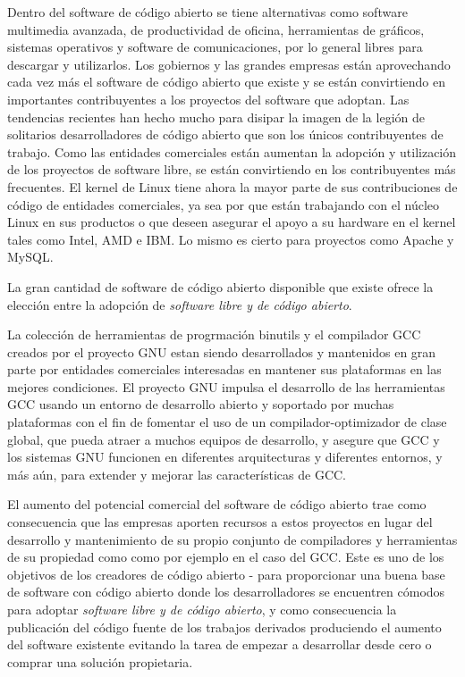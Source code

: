 	Dentro del software de código abierto se tiene alternativas como software multimedia avanzada, de productividad de oficina,  herramientas de
gráficos, sistemas operativos y software de comunicaciones, por lo general libres para descargar y utilizarlos. Los gobiernos y las grandes empresas están aprovechando cada vez más el software de código abierto que existe y se están convirtiendo en importantes contribuyentes a los proyectos del software que adoptan. Las tendencias recientes han hecho mucho para disipar la imagen de la legión de solitarios desarrolladores de código abierto que son los únicos contribuyentes de trabajo.
Como las entidades comerciales están aumentan la adopción y utilización de los proyectos de software libre,  se están convirtiendo en los contribuyentes más frecuentes. El kernel de Linux tiene ahora la mayor parte de sus contribuciones de código de entidades comerciales, ya sea por que están trabajando con el núcleo Linux en sus productos o que deseen asegurar el apoyo a su hardware en el kernel tales como Intel, AMD e IBM. Lo mismo es cierto para proyectos como Apache y MySQL.


La gran cantidad de software de código abierto disponible que existe ofrece la elección entre la adopción de \textit{software libre y de código abierto}. 

La colección de herramientas de progrmación binutils y el compilador GCC creados por el proyecto GNU estan siendo desarrollados y mantenidos en gran parte por entidades comerciales interesadas en mantener sus plataformas en las mejores condiciones. El proyecto GNU impulsa el desarrollo de las herramientas GCC usando un entorno de desarrollo abierto y soportado por muchas plataformas con el fin de fomentar el uso de un compilador-optimizador de clase global, que pueda atraer a muchos equipos de desarrollo, y asegure que GCC y los sistemas GNU funcionen en diferentes arquitecturas y diferentes entornos, y más aún, para extender y mejorar las características de GCC. 

El aumento del potencial comercial del software de código abierto trae como consecuencia que las empresas aporten recursos a estos proyectos en lugar del desarrollo y mantenimiento de su propio conjunto de compiladores y herramientas de su propiedad como como por ejemplo en el caso del GCC. Este es uno de los objetivos de los creadores de código abierto - para proporcionar una buena base de software con código abierto donde los desarrolladores se encuentren cómodos para adoptar  \textit{software libre y de código abierto}, y como consecuencia la publicación del código fuente de los trabajos derivados
produciendo el aumento del software existente evitando la tarea de empezar a desarrollar desde cero o comprar una solución propietaria. 


